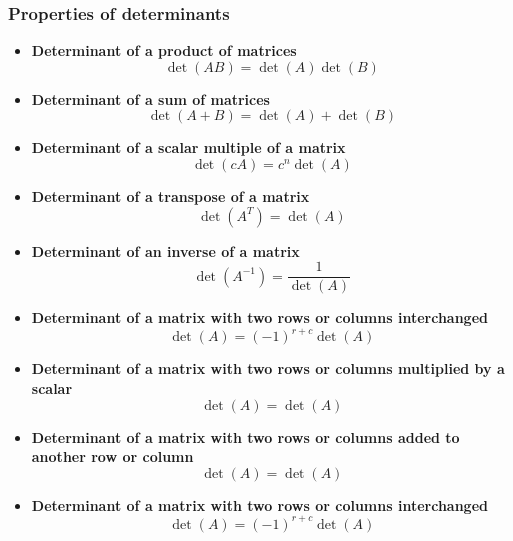 \documentclass[titlepage,a4paper]{article}
\begin{document}
		\subsubsection{Properties of determinants}
			\begin{itemize}
				\item \textbf{Determinant of a product of matrices}
					\begin{equation}
						\det(AB)=\det(A)\det(B)
					\end{equation}
				\item \textbf{Determinant of a sum of matrices}
					\begin{equation}
						\det(A+B)=\det(A)+\det(B)
					\end{equation}
				\item \textbf{Determinant of a scalar multiple of a matrix}
					\begin{equation}
						\det(cA)=c^n\det(A)
					\end{equation}
				\item \textbf{Determinant of a transpose of a matrix}
					\begin{equation}
						\det(A^T)=\det(A)
					\end{equation}
				\item \textbf{Determinant of an inverse of a matrix}
					\begin{equation}
						\det(A^{-1})=\frac{1}{\det(A)}
					\end{equation}
				\item \textbf{Determinant of a matrix with two rows or columns interchanged}
					\begin{equation}
						\det(A)=(-1)^{r+c}\det(A)
					\end{equation}
				\item \textbf{Determinant of a matrix with two rows or columns multiplied by a scalar}
					\begin{equation}
						\det(A)=\det(A)
					\end{equation}
				\item \textbf{Determinant of a matrix with two rows or columns added to another row or column}
					\begin{equation}
						\det(A)=\det(A)
					\end{equation}
				\item \textbf{Determinant of a matrix with two rows or columns interchanged}
					\begin{equation}
						\det(A)=(-1)^{r+c}\det(A)
					\end{equation}

\end{itemize}
\end{document}
